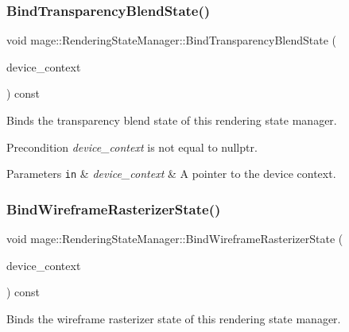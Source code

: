 \subsubsection{\texorpdfstring{Bind\+Transparency\+Blend\+State()}{BindTransparencyBlendState()}}
{\footnotesize\ttfamily void mage\+::\+Rendering\+State\+Manager\+::\+Bind\+Transparency\+Blend\+State (\begin{DoxyParamCaption}\item[{I\+D3\+D11\+Device\+Context4 $\ast$}]{device\+\_\+context }\end{DoxyParamCaption}) const\hspace{0.3cm}{\ttfamily [noexcept]}}

Binds the transparency blend state of this rendering state manager.

\begin{DoxyPrecond}{Precondition}
{\itshape device\+\_\+context} is not equal to {\ttfamily nullptr}. 
\end{DoxyPrecond}

\begin{DoxyParams}[1]{Parameters}
\mbox{\tt in}  & {\em device\+\_\+context} & A pointer to the device context. \\
\hline
\end{DoxyParams}
\hypertarget{classmage_1_1_rendering_state_manager_a1e199563076b4596bfaa0bac22a86848}{}\label{classmage_1_1_rendering_state_manager_a1e199563076b4596bfaa0bac22a86848} 
\subsubsection{\texorpdfstring{Bind\+Wireframe\+Rasterizer\+State()}{BindWireframeRasterizerState()}}
{\footnotesize\ttfamily void mage\+::\+Rendering\+State\+Manager\+::\+Bind\+Wireframe\+Rasterizer\+State (\begin{DoxyParamCaption}\item[{I\+D3\+D11\+Device\+Context4 $\ast$}]{device\+\_\+context }\end{DoxyParamCaption}) const\hspace{0.3cm}{\ttfamily [noexcept]}}

Binds the wireframe rasterizer state of this rendering state manager.

